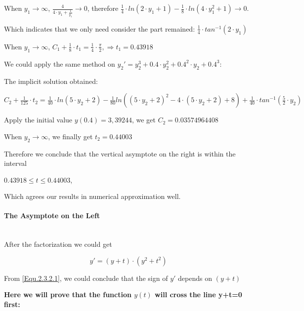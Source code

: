 \documentclass[11pt,a4paper]{article}
\begin{document}
\begin{multicols}{2}
	When $y_1 \rightarrow \infty$, $\frac{4}{4\cdot y_1+\frac{1}{y_1}}\rightarrow 0$, therefore $\frac{1}{4} \cdot ln(2 \cdot y_1 + 1)-\frac{1}{8}\cdot ln(4\cdot y_1^2+1) \rightarrow 0$.
	
	Which indicates that we only need consider the part remained: $\frac{1}{4} \cdot tan^{-1}(2\cdot y_1)$
	
	When $y_1 \rightarrow \infty$, $C_1+ \frac{1}{8}\cdot t_1 = \frac{1}{4} \cdot \frac{\pi}{2}, \Rightarrow t_1 = 0.43918$
	
	We could apply the same method on $y_2' = y_2^3 + 0.4 \cdot y_2^2 + 0.4^2 \cdot y_2 + 0.4 ^3$:
	
	The implicit solution obtained:
	
	\begin{center}
		$C_2 + \frac{1}{125}\cdot t_2 = \frac{1}{40}\cdot ln(5\cdot y_2 + 2)- \frac{1}{80}ln((5\cdot y_2+2)^2 - 4\cdot(5\cdot y_2 + 2)+8)+ \frac{1}{40}\cdot tan^{-1}(\frac{5}{2}\cdot y_2)$
	\end{center}
	
	Apply the initial value $y(0.4)=3,39244$, we get $C_2=0.03574964408$
	
	When $y_2 \rightarrow \infty$, we finally get $t_2=0.44003$
	
	Therefore we conclude that the vertical asymptote on the right is within the interval 
	
	\begin{center}
		$0.43918 \leq t \leq 0.44003$, 
	\end{center}
	
	Which agrees our results in numerical approximation well.
	
	\paragraph{\small The Asymptote on the Left}
	
	~\\
	
	After the factorization we could get
	\begin{center}
		\begin{equation}
			y'=(y+t)\cdot (y^2 + t^2) \tag{Equ 2.3.2.1} \label{Equ.2.3.2.1}
		\end{equation}
	\end{center}

	From \ref{Equ.2.3.2.1}, we could conclude that the sign of $y'$ depends on $(y+t)$
	
	\textbf{Here we will prove that the function $y(t)$ will cross the line y+t=0 first:}
	

\end{multicols}
\end{document}
